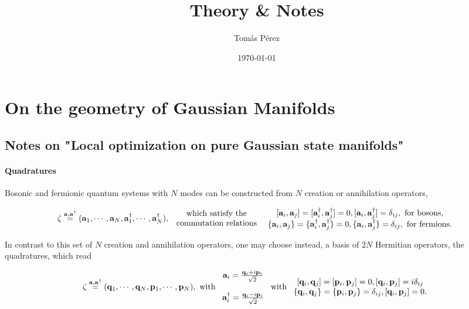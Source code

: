 \documentclass{homework}
\author{Tomás Pérez}
\date{\today}
\title{Theory \& Notes}
\begin{document}
 \maketitle

\section{On the geometry of Gaussian Manifolds}

\subsection{Notes on "Local optimization on pure Gaussian state manifolds"}

\paragraph{Quadratures}

Bosonic and fermionic quantum systems with $N$ modes can be constructed from $N$ creation or annihilation operators, 

\begin{equation}
    \zeta \overset{{\bf a}, {\bf a}^\dagger}{=} ({\bf a}_1, \cdots, {\bf a}_N, {\bf a}_1^\dagger, \cdots, {\bf a}_N^\dagger),
    \begin{array}{cc}
         \textnormal{ which satisfy the } \\
         \textnormal{ commutation relations }
    \end{array}
    \begin{array}{cc}
         [{\bf a}_i, {\bf a}_j] = [{\bf a}_i^{\dagger}, {\bf a}_j^{\dagger}] = 0, [{\bf a}_i, {\bf a}_j^\dagger] = \delta_{ij}, \textnormal{ for bosons}, \\
         \{{\bf a}_i, {\bf a}_j\} = \{{\bf a}_i^{\dagger}, {\bf a}_j^{\dagger}\} = 0, \{{\bf a}_i, {\bf a}_j^\dagger\} = \delta_{ij}, \textnormal{ for fermions}.
    \end{array}
\end{equation}

In contrast to this set of $N$ creation and annihilation operators, one may choose instead, a basis of $2N$ Hermitian operators, the quadratures, which read

\begin{equation}
    \zeta \overset{{\bf a}, {\bf a}^\dagger}{=} ({\bf q}_1, \cdots, {\bf q}_N, {\bf p}_1, \cdots, {\bf p}_N), \textnormal{ with } \begin{array}{cc}
         {\bf a}_i = \frac{{\bf q}_i + i {\bf p}_i}{\sqrt{2}}  \\
         \\
         {\bf a}_i^\dagger = \frac{{\bf q}_i - i {\bf p}_i}{\sqrt{2}}  \\
    \end{array} \textnormal{ with } \begin{array}{cc}
         [{\bf q}_i, {\bf q}_j] = [{\bf p}_i, {\bf p}_j] = 0, [{\bf q}_i, {\bf p}_j] = i\delta_{ij} \\ 
         \{{\bf q}_i, {\bf q}_j\} = \{{\bf p}_i, {\bf p}_j\} = \delta_{ij}, [{\bf q}_i, {\bf p}_j] = 0.
    \end{array}
\end{equation}
\end{document}
